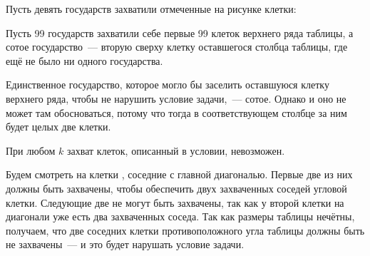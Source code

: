\begin{itemize}

\itA Пусть девять государств захватили отмеченные на рисунке клетки:

\begin{center}
\end{center}

\itB Пусть 99 государств захватили себе первые 99 клеток верхнего ряда таблицы, а сотое государство~— вторую сверху клетку оставшегося столбца таблицы, где ещё не было ни одного государства.

Единственное государство, которое могло бы заселить оставшуюся клетку верхнего ряда, чтобы не нарушить условие задачи,~— сотое. Однако и оно не может там обосноваться, потому что тогда в соответствующем столбце за ним будет целых две клетки.

\itC При любом $k$ захват клеток, описанный в условии, невозможен.

\begin{center}
\end{center}

Будем смотреть на клетки , соседние с главной диагональю. Первые две из них должны быть захвачены, чтобы обеспечить двух захваченных соседей угловой клетки. Следующие две не могут быть захвачены, так как у второй клетки на диагонали уже есть два захваченных соседа. Так как размеры таблицы нечётны, получаем, что две соседних клетки противоположного угла таблицы должны быть не захвачены~— и это будет нарушать условие задачи.
\end{itemize}